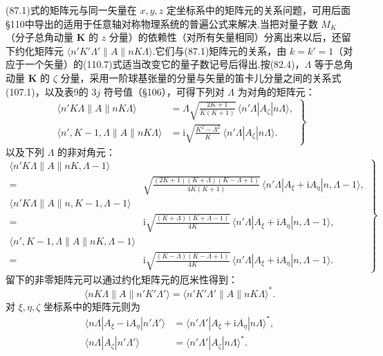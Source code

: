 (87.1)式的矩阵元与同一矢量在 $x,y,z$ 定坐标系中的矩阵元的关系问题，可用后面§110中导出的适用于任意轴对称物理系统的普遍公式来解决.当把对量子数 $M_K$（分子总角动量 $\boldsymbol{K}$ 的 $z$ 分量）的依赖性（对所有矢量相同）分离出来以后，还留下约化矩阵元 $\langle n'K'\Lambda'\parallel A\parallel nK\Lambda\rangle$.它们与(87.1)矩阵元的关系，由 $k=k'=1$（对应于一个矢量）的(110.7)式适当改变它的量子数记号后得出.按(82.4)，$\Lambda$ 等于总角动量 $\boldsymbol{K}$ 的 $\zeta$ 分量，采用一阶球基张量的分量与矢量的笛卡儿分量之间的关系式(107.1)，以及表9的 $3j$ 符号值（§106），可得下列对 $\Lambda$ 为对角的矩阵元：
\begin{equation}
\left.\begin{aligned}
  \langle n'K\Lambda\parallel A\parallel nK\Lambda\rangle
  &=\Lambda\sqrt{\frac{2K+1}{K(K+1)}}\,
  \langle n'\Lambda|A_\zeta|n\Lambda\rangle,\\
  \langle n',K-1,\Lambda\parallel A\parallel nK\Lambda\rangle
  &=\mathrm{i}\sqrt{\frac{K^2-\Lambda^2}{K}}\,
  \langle n'\Lambda|A_\zeta|n\Lambda\rangle.
\end{aligned}\right\}
\end{equation}
以及下列 $\Lambda$ 的非对角元：
\begin{equation}
\left.\begin{aligned}
  \langle n'K\Lambda\parallel A\parallel nK,\Lambda-1\rangle&\\
  ={}&\sqrt{\frac{(2K+1)(K+\Lambda)(K-\Lambda+1)}{4K(K+1)}}\,
  \langle n'\Lambda|A_\xi+\mathrm{i}A_\eta|n,\Lambda-1\rangle,\\
  \langle n'K\Lambda\parallel A\parallel n,K-1,\Lambda-1\rangle&\\
  ={}&\mathrm{i}\sqrt{\frac{(K+\Lambda)(K+\Lambda-1)}{4K}}\,
  \langle n'\Lambda|A_\xi+\mathrm{i}A_\eta|n,\Lambda-1\rangle,\\
  \langle n',K-1,\Lambda\parallel A\parallel nK,\Lambda-1\rangle&\\
  ={}&\mathrm{i}\sqrt{\frac{(K-\Lambda)(K-\Lambda+1)}{4K}}\,
  \langle n'\Lambda|A_\xi+\mathrm{i}A_\eta|n,\Lambda-1\rangle.
\end{aligned}\right\}
\end{equation}
留下的非零矩阵元可以通过约化矩阵元的厄米性得到：
\begin{equation*}
  \langle nK\Lambda\parallel A\parallel n'K'\Lambda'\rangle
  =\langle n'K'\Lambda'\parallel A\parallel nK\Lambda\rangle^{*}.
\end{equation*}
对 $\xi,\eta,\zeta$ 坐标系中的矩阵元则为
\begin{equation*}
\begin{aligned}
  \langle n\Lambda|A_\xi-\mathrm{i}A_\eta|n'\Lambda'\rangle
  &=\langle n'\Lambda'|A_\xi+\mathrm{i}A_\eta|n\Lambda\rangle^{*},\\
  \langle n\Lambda|A_\zeta|n'\Lambda'\rangle
  &=\langle n'\Lambda'|A_\zeta|n\Lambda\rangle^{*}.
\end{aligned}
\end{equation*}
